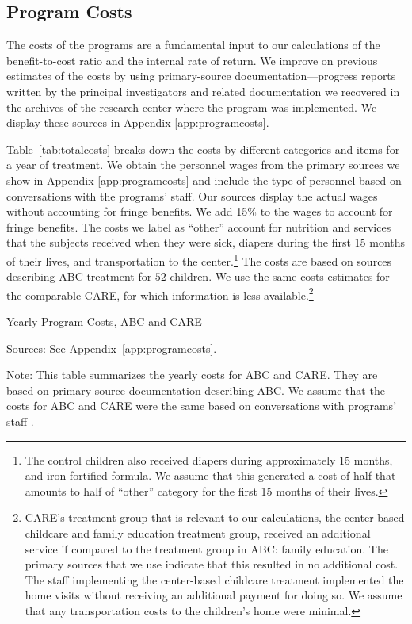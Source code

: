 \subsection{Program Costs} \label{section:programscosts}

The costs of the programs are a fundamental input to our calculations of the benefit-to-cost ratio and the internal rate of return. We improve on previous estimates of the costs by using primary-source documentation---progress reports written by the principal investigators and related documentation we recovered in the archives of the research center where the program was implemented. We display these sources in Appendix \ref{app:programcosts}.

Table~\ref{tab:totalcosts} breaks down the costs by different categories and items for a year of treatment. We obtain the personnel wages from the primary sources we show in Appendix \ref{app:programcosts} and include the type of personnel based on conversations with the programs' staff. Our sources display the actual wages without accounting for fringe benefits. We add 15\% to the wages to account for fringe benefits. The costs we label as ``other'' account for nutrition and services that the subjects  received when they were sick, diapers during the first 15 months of their lives, and transportation to the center.\footnote{The control children also received diapers during approximately 15 months, and iron-fortified formula. We assume that this generated a cost of half that amounts to half of ``other'' category for the first 15 months of their lives.} The costs are based on sources describing ABC treatment for $52$ children. We use the same costs estimates for the comparable CARE, for which information is less available.\footnote{CARE's treatment group that is relevant to our calculations, the center-based childcare and family education treatment group, received an additional service if compared to the treatment group in ABC: family education. The primary sources that we use indicate that this resulted in no additional cost. The staff implementing the center-based childcare treatment implemented the home visits without receiving an additional payment for doing so. We assume that any transportation costs to the children's home were minimal.}

\begin{table}[H]
\begin{threeparttable}
\caption{Yearly Program Costs, ABC and CARE} \label{tab:totalcosts}
\footnotesize

\begin{tablenotes}
\footnotesize
\item Sources: See Appendix~\ref{app:programcosts}.\\
\item Note: This table summarizes the yearly costs for ABC and CARE. They are based on primary-source documentation describing ABC. We assume that the costs for ABC and CARE were the same based on conversations with programs' staff \citet{projectcare2014interviews,abc2014-2015interviews}.
\end{tablenotes}
\end{threeparttable}
\end{table}

